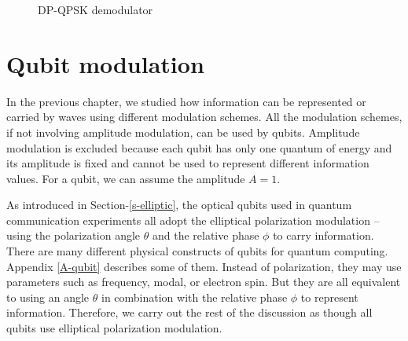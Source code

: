 \documentclass[oneside, letter, 12pt]{book}
\begin{document}
\begin{figure}\label{Demodulator-DP-QPSK}
    \caption{DP-QPSK demodulator}
\end{figure}

\chapter{Qubit modulation}\label{c-qinfo}
In the previous chapter, we studied how information can be represented or carried by waves using different modulation schemes. All the modulation schemes, if not involving amplitude modulation, can be used by qubits. Amplitude modulation is excluded because each qubit has only one quantum of energy and its amplitude is fixed and cannot be used to represent different information values. For a qubit, we can assume the amplitude $A=1$.

As introduced in Section-\ref{s-elliptic}, the optical qubits used in quantum communication experiments all adopt the elliptical polarization modulation -- using the polarization angle $\theta$ and the relative phase $\phi$ to carry information. There are many different physical constructs of qubits for quantum computing. Appendix \ref{A-qubit} describes some of them. Instead of polarization, they may use parameters such as frequency, modal, or electron spin. But they are all equivalent to using an angle $\theta$ in combination with the relative phase $\phi$ to represent information. Therefore, we carry out the rest of the discussion as though all qubits use elliptical polarization modulation.
\end{document}
